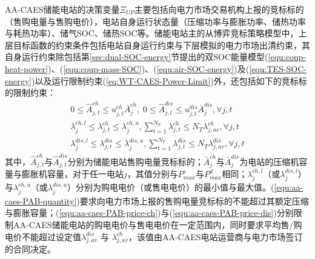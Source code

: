 AA-CAES储能电站的决策变量$\Xi_{UP}$主要包括向电力市场交易机构上报的竞标标的（售购电量与售购电价），电站自身运行状态量（压缩功率与膨胀功率、储热功率与耗热功率）、储气SOC、储热SOC等\cite{CAES-DAM-Rui-18}。储能电站主的从博弈竞标策略模型中，上层目标函数的约束条件包括电站自身运行约束与下层模拟的电力市场出清约束，其自身运行约束除包括第\ref{sec:dual-SOC-energy}节提出的双SOC能量模型(\ref{equ:coup-heat-power})、(\ref{equ:coup-mass-SOC})、(\ref{equ:air-SOC-energy})及(\ref{equ:TES-SOC-energy})以及运行限制约束(\ref{eq:WT-CAES-Power-Limit})外，还包括如下的竞标标的限制约束：
\begin{subequations}
\label{equ:aa-caes-pab-bid-cons}
\begin{gather}
0 \le \hat A_{j,t}^{ch} \le u_{j,t}^{ch}\bar A_j^{ch},\;0 \le \hat A_{j,t}^{dis} \le u_{j,t}^{dis}\bar A_j^{dis}, \forall j,t \label{equ:aa-caes-PAB-quantity} \\
\lambda _{j}^{ch,l} \le \lambda _{j,t}^{ch} \le \lambda _{j}^{ch,u},\sum\nolimits_{t = 1}^{{N_T}} {\lambda _{j,t}^{ch}}  \le {N_T}\lambda _{j,av}^{ch} \label{equ:aa-caes-PAB-price-ch},\forall j,t \\
\lambda _{j}^{dis,l} \le \lambda _{j,t}^{dis} \le \lambda _{j}^{dis,u},\sum\nolimits_{t = 1}^{{N_T}} {\lambda _{j,t}^{dis}} \le {N_T}\lambda _{j,av}^{dis} \label{equ:aa-caes-PAB-price-dis}, \forall j,t
\end{gather}
\end{subequations}
其中，$\hat A_{j,t}^{ch}$与$\hat A_{j,t}^{dis}$分别为储能电站售购电量竞标标的；$\bar A_j^{ch}$与$\bar A_j^{dis}$为电站的压缩机容量与膨胀机容量，对于任一电站$j$，其值分别与$P_{max}^c$与$P_{max}^d$相同；$\lambda_j^{ch,l}$（或$\lambda_j^{dis,l}$）与$\lambda_j^{ch,u}$（或$\lambda_j^{dis,u}$）分别为购电电价（或售电电价）的最小值与最大值。(\ref{equ:aa-caes-PAB-quantity})要求向电力市场上报的售购电量竞标标的不能超过其额定压缩与膨胀容量；(\ref{equ:aa-caes-PAB-price-ch})与(\ref{equ:aa-caes-PAB-price-dis})分别限制AA-CAES储能电站的购电电价与售电电价在一定范围内，同时要求平均售/购电价不能超过设定值$\lambda _{j,av}^{dis}$ 与 $\lambda _{j,av}^{ch}$，该值由AA-CAES电站运营商与电力市场签订的合同决定。

